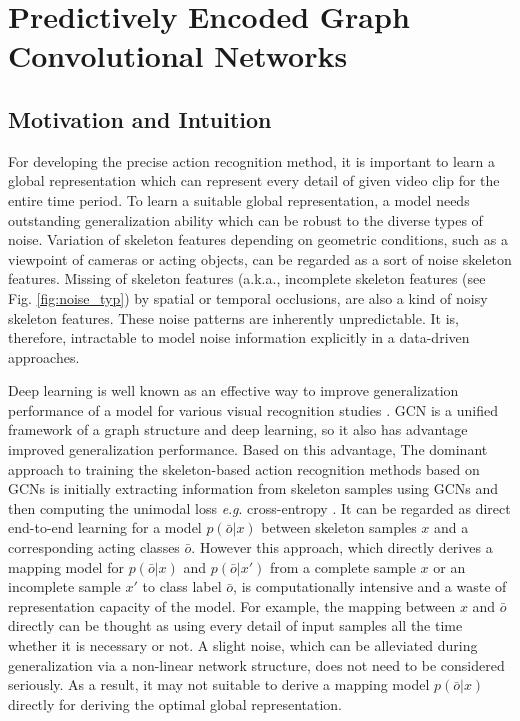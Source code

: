 \documentclass[runningheads]{llncs}
\newcommand{\eg}{\textit{e}.\textit{g}. }
\begin{document}
\section{Predictively Encoded Graph Convolutional Networks}
\label{sec:3}
\subsection{Motivation and Intuition}
For developing the precise action recognition method, it is important to learn a global representation which can represent every detail of given video clip for the entire time period. To learn a suitable global representation, a model needs outstanding generalization ability which can be robust to the diverse types of noise. Variation of skeleton features depending on geometric conditions, such as a viewpoint of cameras or acting objects, can be regarded as a sort of noise skeleton features. Missing of skeleton features (a.k.a., incomplete skeleton features \cite{song2019richly} (see Fig. \ref{fig:noise_typ}) by spatial or temporal occlusions, are also a kind of noisy skeleton features. These noise patterns are inherently unpredictable. It is, therefore, intractable to model noise information explicitly in a data-driven approaches.

Deep learning is well known as an effective way to improve generalization performance of a model for various visual recognition studies \cite{krizhevsky2012imagenet,du2015hierarchical,badrinarayanan2017segnet,girshick2015fast}. GCN is a unified framework of a graph structure and deep learning, so it also has advantage improved generalization performance. Based on this advantage, The dominant approach to training the skeleton-based action recognition methods based on GCNs is initially extracting information from skeleton samples using GCNs and then computing the unimodal loss \eg cross-entropy \cite{yan2018spatial,shi2019two,shi2019skeleton,song2019richly,li2019actional,si2019attention}. It can be regarded as direct end-to-end learning for a model $p(\bar{o}|x)$ between skeleton samples $x$ and a corresponding acting classes $\bar{o}$. However this approach, which directly derives a mapping model for $p(\bar{o}|x)$ and $p(\bar{o}|x')$ from a complete sample $x$ or an incomplete sample $x'$ to class label $\bar{o}$, is computationally intensive and a waste of representation capacity of the model. For example, the mapping between $x$ and $\bar{o}$ directly can be thought as using every detail of input samples all the time whether it is necessary or not. A slight noise, which can be alleviated during generalization via a non-linear network structure, does not need to be considered seriously. As a result, it may not suitable to derive a mapping model $p(\bar{o}|x)$ directly for deriving the optimal global representation.
\end{document}
